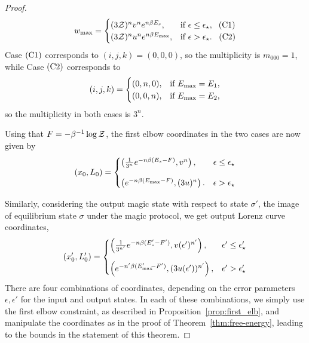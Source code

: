 \documentclass[
twocolumn,
superscriptaddress
]{revtex4-1}
\def\Z{{\cal Z}}
\begin{document}
\begin{proof}
\begin{equation*}
w_{\rm max} =
	\begin{cases}
		(3\Z)^{n} v^n e^{n\beta E_s}, &\mbox{if }\epsilon \leq \epsilon_{\star},\ \hspace{3pt}\rm{(C1)}\\
		(3\Z)^{n} u^n e^{n\beta E_{\rm{max}}}, &\mbox{if }\epsilon > \epsilon_{\star}.\ \hspace{5pt}\rm{(C2)} 
	\end{cases}
\end{equation*}
Case $\rm{(C1)}$ corresponds to $(i,j,k) = (0,0,0)$, so the multiplicity is $m_{000} = 1$, while
Case $\rm{(C2)}$ corresponds to
\begin{equation}
	(i,j,k) = 
	\begin{cases}
	(0,n,0), &\text{if } E_{\rm{max}} = E_1, \\
	(0,0,n), &\text{if } E_{\rm{max}} = E_2,
	\end{cases}
\end{equation}
so the multiplicity in both cases is $3^n$.

Using that $F = -\beta^{-1} \log \Z$, the first elbow coordinates in the two cases are now given by
\begin{equation}\label{eq:first_elb_coords}
	(x_0, L_0) =
	\begin{cases}
		\left(\frac{1}{3^n} e^{-n\beta (E_s - F)}, v^n \right), &\epsilon \leq \epsilon_\star \vspace{10pt}\\
		\left( e^{-n\beta (E_{\rm{max}}-F)}, (3u)^n \right). &\epsilon > \epsilon_\star
	\end{cases}
\end{equation}

Similarly, considering the output magic state with respect to state $\sigma'$, the image of equilibrium state $\sigma$ under the magic protocol, we get output Lorenz curve coordinates,
\begin{equation}\label{eq:transformed_first_elb_coords}
	(x'_0, L'_0) =
	\begin{cases}
		\left(\frac{1}{3^{n'}} e^{-n\beta (E'_s - F')}, v(\epsilon')^{n'} \right), &\epsilon' \leq \epsilon'_\star \vspace{10pt}\\
		\left( e^{-n'\beta (E'_{\rm{max}}\hspace{-2.5pt}-F')}, (3u(\epsilon'))^{n'} \right), &\epsilon' > \epsilon'_\star
	\end{cases}
\end{equation}
There are four combinations of coordinates, depending on the error parameters $\epsilon, \epsilon'$ for the input and output states.
In each of these combinations, we simply use the first elbow constraint, as described in Proposition~\ref{prop:first_elb}, and manipulate the coordinates as in the proof of Theorem~\ref{thm:free-energy}, leading to the bounds in the statement of this theorem.
\end{proof}
\end{document}
